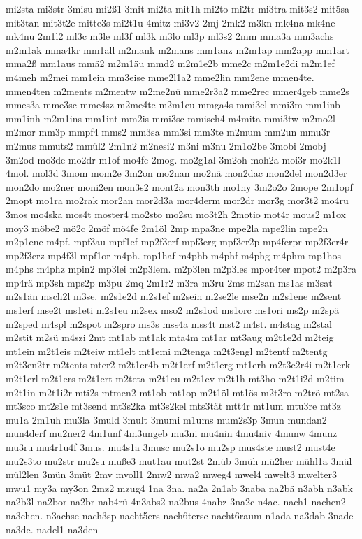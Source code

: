 {mi2sta
mi3str
3misu
mi2ß1
3mit
mi2ta
mit1h
mi2to
mi2tr
mi3tra
mit3s2
mit5sa
mit3tan
mit3t2e
mitte3s
mi2t1u
4mitz
mi3v2
2mj
2mk2
m3kn
mk4na
mk4ne
mk4nu
2m1l2
ml3c
m3le
ml3f
ml3k
m3lo
ml3p
ml3s2
2mm
mma3a
mm3achs
m2m1ak
mma4kr
mm1all
m2mank
m2mans
mm1anz
m2m1ap
mm2app
mm1art
mma2ß
mm1aus
mmä2
m2m1äu
mmd2
m2m1e2b
mme2c
m2m1e2di
m2m1ef
m4meh
m2mei
mm1ein
mm3eise
mme2l1a2
mme2lin
mm2ene
mmen4te.
mmen4ten
m2ments
m2mentw
m2me2nü
mme2r3a2
mme2rec
mmer4geb
mme2s
mmes3a
mme3sc
mme4sz
m2me4te
m2m1eu
mmga4s
mmi3el
mmi3m
mm1inb
mm1inh
m2m1ins
mm1int
mm2is
mmi3sc
mmisch4
m4mita
mmi3tw
m2mo2l
m2mor
mm3p
mmpf4
mms2
mm3sa
mm3si
mm3te
m2mum
mm2un
mmu3r
m2mus
mmuts2
mmül2
2m1n2
m2nesi2
m3ni
m3nu
2m1o2be
3mobi
2mobj
3m2od
mo3de
mo2dr
m1of
mo4fe
2mog.
mo2g1al
3m2oh
moh2a
moi3r
mo2k1l
4mol.
mol3d
3mom
mom2e
3m2on
mo2nan
mo2nä
mon2dac
mon2del
mon2d3er
mon2do
mo2ner
moni2en
mon3s2
mont2a
mon3th
mo1ny
3m2o2o
2mope
2m1opf
2mopt
mo1ra
mo2rak
mor2an
mor2d3a
mor4derm
mor2dr
mor3g
mor3t2
mo4ru
3mos
mo4ska
mos4t
moster4
mo2sto
mo2su
mo3t2h
2motio
mot4r
mous2
m1ox
moy3
möbe2
mö2c
2möf
mö4fe
2m1öl
2mp
mpa3ne
mpe2la
mpe2lin
mpe2n
m2p1ene
m4pf.
mpf3au
mpf1ef
mp2f3erf
mpf3erg
mpf3er2p
mp4ferpr
mp2f3er4r
mp2f3erz
mp4f3l
mpf1or
m4ph.
mp1haf
m4phb
m4phf
m4phg
m4phm
mp1hos
m4phs
m4phz
mpin2
mp3lei
m2p3lem.
m2p3len
m2p3les
mpor4ter
mpot2
m2p3ra
mp4rä
mp3sh
mps2p
m3pu
2mq
2m1r2
m3ra
m3ru
2ms
m2san
ms1as
m3sat
m2s1än
msch2l
m3se.
m2s1e2d
m2s1ef
m2sein
m2se2le
mse2n
m2s1ene
m2sent
ms1erf
mse2t
ms1eti
m2s1eu
m2sex
mso2
m2s1od
ms1orc
ms1ori
ms2p
m2spä
m2sped
m4spl
m2spot
m2spro
ms3s
mss4a
mss4t
mst2
m4st.
m4stag
m2stal
m2stit
m2sü
m4szi
2mt
mt1ab
mt1ak
mta4m
mt1ar
mt3aug
m2t1e2d
m2teig
mt1ein
m2t1eis
m2teiw
mt1elt
mt1emi
m2tenga
m2t3engl
m2tentf
m2tentg
m2t3en2tr
m2tents
mter2
m2t1er4b
m2t1erf
m2t1erg
mt1erh
m2t3e2r4i
m2t1erk
m2t1erl
m2t1ers
m2t1ert
m2teta
m2t1eu
m2t1ev
m2t1h
mt3ho
m2t1i2d
m2tim
m2t1in
m2t1i2r
mti2s
mtmen2
mt1ob
mt1op
m2t1öl
mt1ös
m2t3ro
m2trö
mt2sa
mt3sco
mt2s1e
mt3send
mt3s2ka
mt3s2kel
mts3tät
mtt4r
mt1um
mtu3re
mt3z
mu1a
2m1uh
mu3la
3muld
3mult
3mumi
m1ums
mum2s3p
3mun
mundan2
mun4derf
mu2ner2
4m1unf
4m3ungeb
mu3ni
mu4nin
4mu4niv
4munw
4munz
mu3ru
mu4r1u4f
3mus.
mu4s1a
3musc
mu2s1o
mu2sp
mus4ste
must2
must4e
mu2s3to
mu2str
mu2su
muße3
mut1au
mut2st
2müb
3müh
mü2her
mühl1a
3mül
mül2len
3mün
3müt
2mv
mvoll1
2mw2
mwa2
mweg4
mwel4
mwelt3
mwelter3
mwu1
my3a
my3on
2mz2
mzug4
1na
3na.
na2a
2n1ab
3naba
na2bä
n3abh
n3abk
na2b3l
na2bor
na2br
nab4rü
4n3abs2
na2bus
4nabz
3na2c
n4ac.
nach1
nachen2
na3chen.
n3achse
nach3sp
nacht5ers
nach6tersc
nacht6raum
n1ada
na3dab
3nade
na3de.
nadel1
na3den
}
